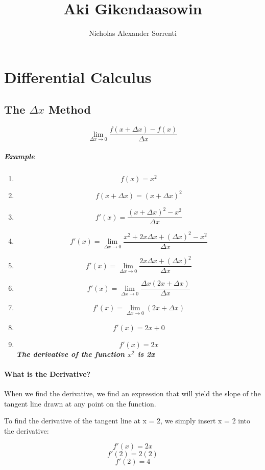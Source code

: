 \documentclass[a4paper,11pt]{book}
\title{Aki Gikendaasowin}
\author{Nicholas Alexander Sorrenti}
\begin{document}
\maketitle
\tableofcontents

\chapter{Differential Calculus}
\section{The $ \Delta x $ Method}
\LARGE 
\[ \lim_{\Delta x \to 0} \frac{f(x + \Delta x) - f(x)}{\Delta x} \]

\paragraph{Example}
\begin{enumerate}
  \item \[ f(x) = x^2 \]
  \item \[ f(x + \Delta x) = (x + \Delta x)^2 \]
  \item \[ f'(x) = \frac{(x + \Delta x)^2 - x^2}{\Delta x} \]
  \item \[ f'(x) = \lim_{\Delta x \to 0} \frac{x^2 + 2x\Delta x + (\Delta x)^2 - x^2}{\Delta x} \]
  \item \[ f'(x) = \lim_{\Delta x \to 0} \frac{2x\Delta x + (\Delta x)^2}{\Delta x} \]
  \item \[ f'(x) = \lim_{\Delta x \to 0} \frac{\Delta x (2x +\Delta x)}{\Delta x} \]  
  \item \[ f'(x) = \lim_{\Delta x \to 0} (2x +\Delta x) \]
  \item \[ f'(x) = 2x + 0 \]
  \item \[ f'(x) = 2x \]
  \large 
  \textit{\textbf{The derivative of the function $ x^2 $ is 2x}}
\end{enumerate}

\subsubsection{What is the Derivative?}
\normalsize 
When we find the derivative, we find an expression that will yield the slope of the tangent line drawn at any point on the function.

To find the derivative of the tangent line at x = 2, we simply insert x = 2 into the derivative:

\[ f'(x) = 2x \]
\[ f'(2) = 2(2) \]
\[ f'(2) = 4 \]
\end{document}
